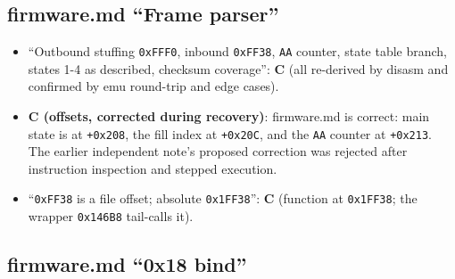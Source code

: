 \subsection{firmware.md ``Frame
parser''}\label{firmware.md-frame-parser}

\begin{itemize}
\tightlist
\item
  ``Outbound stuffing \texttt{0xFFF0}, inbound \texttt{0xFF38},
  \texttt{AA} counter, state table branch, states 1-4 as described,
  checksum coverage'': \textbf{C} (all re-derived by disasm and
  confirmed by emu round-trip and edge cases).
\item
  \textbf{C (offsets, corrected during recovery)}: firmware.md is
  correct: main state is at \texttt{+0x208}, the fill index at
  \texttt{+0x20C}, and the \texttt{AA} counter at \texttt{+0x213}. The
  earlier independent note's proposed correction was rejected after
  instruction inspection and stepped execution.
\item
  ``\texttt{0xFF38} is a file offset; absolute \texttt{0x1FF38}'':
  \textbf{C} (function at \texttt{0x1FF38}; the wrapper \texttt{0x146B8}
  tail-calls it).
\end{itemize}

\subsection{firmware.md ``0x18 bind''}\label{firmware.md-0x18-bind}

